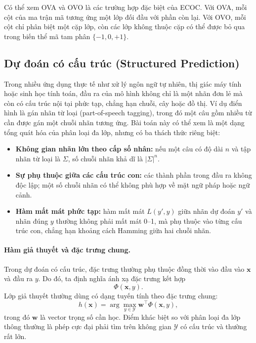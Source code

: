 Có thể xem OVA và OVO là các trường hợp đặc biệt của ECOC. Với OVA, mỗi cột của ma trận mã tương ứng một lớp đối đầu với phần còn lại. Với OVO, mỗi cột chỉ phân biệt một cặp lớp, còn các lớp không thuộc cặp có thể được bỏ qua trong biến thể mã tam phân $\{-1,0,+1\}$.
\subsection{Dự đoán có cấu trúc (Structured Prediction)}

Trong nhiều ứng dụng thực tế như xử lý ngôn ngữ tự nhiên, thị giác máy tính hoặc sinh học tính toán, đầu ra của mô hình không chỉ là một nhãn đơn lẻ mà còn có cấu trúc nội tại phức tạp, chẳng hạn chuỗi, cây hoặc đồ thị. Ví dụ điển hình là gán nhãn từ loại (part-of-speech tagging), trong đó một câu gồm nhiều từ cần được gán một chuỗi nhãn tương ứng. Bài toán này có thể xem là một dạng tổng quát hóa của phân loại đa lớp, nhưng có ba thách thức riêng biệt:
\begin{itemize}[leftmargin=2em]
  \item \textbf{Không gian nhãn lớn theo cấp số nhân:} nếu một câu có độ dài $n$ và tập nhãn từ loại là $\Sigma$, số chuỗi nhãn khả dĩ là $|\Sigma|^n$.
  \item \textbf{Sự phụ thuộc giữa các cấu trúc con:} các thành phần trong đầu ra không độc lập; một số chuỗi nhãn có thể không phù hợp về mặt ngữ pháp hoặc ngữ cảnh.
  \item \textbf{Hàm mất mát phức tạp:} hàm mất mát $L(y',y)$ giữa nhãn dự đoán $y'$ và nhãn đúng $y$ thường không phải mất mát 0--1, mà phụ thuộc vào từng cấu trúc con, chẳng hạn khoảng cách Hamming giữa hai chuỗi nhãn.
\end{itemize}

\paragraph{Hàm giả thuyết và đặc trưng chung.}
Trong dự đoán có cấu trúc, đặc trưng thường phụ thuộc đồng thời vào đầu vào $\bm{x}$ và đầu ra $y$. Do đó, ta định nghĩa ánh xạ đặc trưng kết hợp
\[
  \Phi(\bm{x},y).
\]
Lớp giả thuyết thường dùng có dạng tuyến tính theo đặc trưng chung:
\[
  h(\bm{x})=\arg\max_{y\in\mathcal{Y}}\bm{w}^{\top}\Phi(\bm{x},y),
\]
trong đó $\bm{w}$ là vector trọng số cần học. Điểm khác biệt so với phân loại đa lớp thông thường là phép cực đại phải tìm trên không gian $\mathcal{Y}$ có cấu trúc và thường rất lớn.

